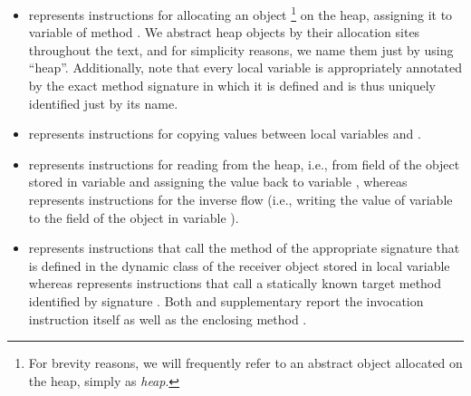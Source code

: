 \begin{itemize}
\item {} represents instructions for allocating an object \footnote{For brevity reasons, we will frequently refer to an abstract object allocated on the heap, simply as \emph{heap}.} on the heap, assigning it to variable  of method . We abstract heap objects by their allocation sites throughout the text, and for simplicity reasons, we name them just by using ``heap''. Additionally, note that every local variable is appropriately annotated by the exact method signature in which it is defined and is thus uniquely identified just by its name.

\item {} represents instructions for copying values between local variables  and .

\item {} represents instructions for reading from the heap, i.e., from field  of the object stored in variable  and assigning the value back to variable , whereas  represents instructions for the inverse flow (i.e., writing the value of variable  to the field  of the object in variable ).

\item {} represents instructions that call the method of the appropriate signature  that is defined in the dynamic class of the receiver object stored in local variable  whereas  represents instructions that call a statically known target method identified by signature . Both  and  supplementary report the invocation instruction  itself as well as the enclosing method .
\end{itemize}

